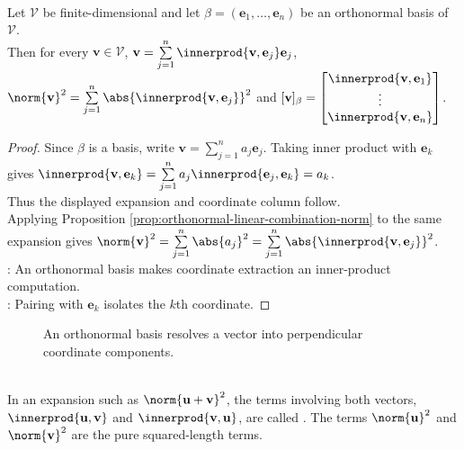 \begin{theorem} \label{thm:orthonormal-basis-coordinates} \\
Let $\mathcal{V}$ be finite-dimensional and let $\beta=(\mathbf{e}_1,\ldots,\mathbf{e}_n)$ be an orthonormal basis of $\mathcal{V}$.\\
Then for every $\mathbf{v}\in\mathcal{V}$, $\mathbf{v}=\sum\limits_{j=1}^{n}\innerprod{\mathbf{v},\mathbf{e}_j}\mathbf{e}_j$, $\norm{\mathbf{v}}^2=\sum\limits_{j=1}^{n}\abs{\innerprod{\mathbf{v},\mathbf{e}_j}}^2$ and $[\mathbf{v}]_{\beta}=
\begin{bmatrix}
\innerprod{\mathbf{v},\mathbf{e}_1}\\
\vdots\\
\innerprod{\mathbf{v},\mathbf{e}_n}
\end{bmatrix}$.
\begin{proof}
Since $\beta$ is a basis, write $\mathbf{v}=\sum\limits_{j=1}^{n}a_j\mathbf{e}_j$. Taking inner product with $\mathbf{e}_k$ gives $\innerprod{\mathbf{v},\mathbf{e}_k}=\sum\limits_{j=1}^{n}a_j\innerprod{\mathbf{e}_j,\mathbf{e}_k}=a_k$.\\
Thus the displayed expansion and coordinate column follow.\\
Applying Proposition \ref{prop:orthonormal-linear-combination-norm} to the same expansion gives $\norm{\mathbf{v}}^2=\sum\limits_{j=1}^{n}\abs{a_j}^2=\sum\limits_{j=1}^{n}\abs{\innerprod{\mathbf{v},\mathbf{e}_j}}^2$.\\
: An orthonormal basis makes coordinate extraction an inner-product computation.\\
: Pairing with $\mathbf{e}_k$ isolates the $k$th coordinate.
\end{proof}
\end{theorem}

\begin{figure}[H]
  \centering
  
  \caption{An orthonormal basis resolves a vector into perpendicular coordinate components.}
  \label{fig:orthonormal-coordinates}
\end{figure}

\begin{remark} \label{rem:cross-terms} \\
In an expansion such as $\norm{\mathbf{u}+\mathbf{v}}^2$, the terms involving both vectors, $\innerprod{\mathbf{u},\mathbf{v}}$ and $\innerprod{\mathbf{v},\mathbf{u}}$, are called . The terms $\norm{\mathbf{u}}^2$ and $\norm{\mathbf{v}}^2$ are the pure squared-length terms.
\end{remark}

